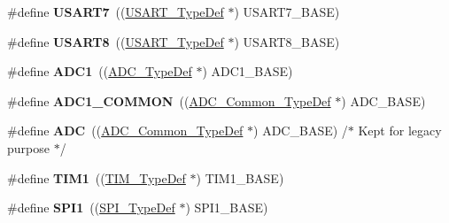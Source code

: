 \begin{DoxyCompactItemize}
\mbox{\label{group___peripheral__declaration_ga5ccb06564cf2da2aa45ce492382f88ab}} 
\#define {\bfseries U\+S\+A\+R\+T7}~((\hyperlink{struct_u_s_a_r_t___type_def}{U\+S\+A\+R\+T\+\_\+\+Type\+Def} $\ast$) U\+S\+A\+R\+T7\+\_\+\+B\+A\+SE)
\item 
\mbox{\label{group___peripheral__declaration_ga91372b4c8cf79ad0895cbc38658d2d85}} 
\#define {\bfseries U\+S\+A\+R\+T8}~((\hyperlink{struct_u_s_a_r_t___type_def}{U\+S\+A\+R\+T\+\_\+\+Type\+Def} $\ast$) U\+S\+A\+R\+T8\+\_\+\+B\+A\+SE)
\item 
\mbox{\label{group___peripheral__declaration_ga90d2d5c526ce5c0a551f533eccbee71a}} 
\#define {\bfseries A\+D\+C1}~((\hyperlink{struct_a_d_c___type_def}{A\+D\+C\+\_\+\+Type\+Def} $\ast$) A\+D\+C1\+\_\+\+B\+A\+SE)
\item 
\mbox{\label{group___peripheral__declaration_gaf1919c64fc774aab31190346fd5457e2}} 
\#define {\bfseries A\+D\+C1\+\_\+\+C\+O\+M\+M\+ON}~((\hyperlink{struct_a_d_c___common___type_def}{A\+D\+C\+\_\+\+Common\+\_\+\+Type\+Def} $\ast$) A\+D\+C\+\_\+\+B\+A\+SE)
\item 
\mbox{\label{group___peripheral__declaration_ga54d148b91f3d356713f7e367a2243bea}} 
\#define {\bfseries A\+DC}~((\hyperlink{struct_a_d_c___common___type_def}{A\+D\+C\+\_\+\+Common\+\_\+\+Type\+Def} $\ast$) A\+D\+C\+\_\+\+B\+A\+SE) /$\ast$ Kept for legacy purpose $\ast$/
\item 
\mbox{\label{group___peripheral__declaration_ga2e87451fea8dc9380056d3cfc5ed81fb}} 
\#define {\bfseries T\+I\+M1}~((\hyperlink{struct_t_i_m___type_def}{T\+I\+M\+\_\+\+Type\+Def} $\ast$) T\+I\+M1\+\_\+\+B\+A\+SE)
\item 
\mbox{\label{group___peripheral__declaration_gad483be344a28ac800be8f03654a9612f}} 
\#define {\bfseries S\+P\+I1}~((\hyperlink{struct_s_p_i___type_def}{S\+P\+I\+\_\+\+Type\+Def} $\ast$) S\+P\+I1\+\_\+\+B\+A\+SE)
\item 
\mbox{\label{group___peripheral__declaration_gaf2c3d8ce359dcfbb2261e07ed42af72b}} 

\end{DoxyCompactItemize}
